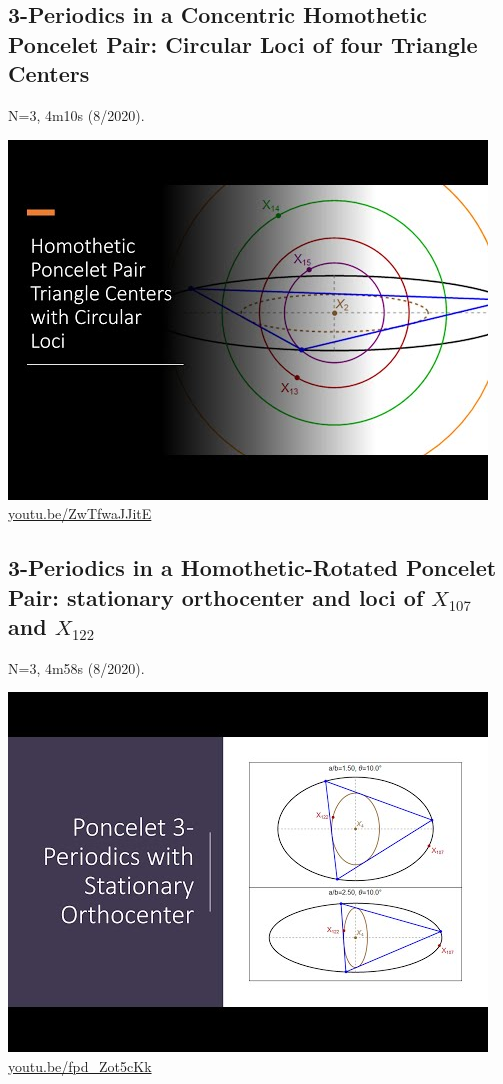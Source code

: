 \documentclass[12pt]{amsart}
\begin{document}
\subsection{3-Periodics in a Concentric Homothetic Poncelet Pair: Circular Loci of four Triangle Centers}
\label{vid:ZwTfwaJJitE}
\noindent N=3, 4m10s (8/2020). 
\begin{center}\includegraphics[width=.5\textwidth]{pics/ZwTfwaJJitE.jpg} \\ 
\href{https://youtu.be/ZwTfwaJJitE}{\url{youtu.be/ZwTfwaJJitE}}\end{center}
% 
\subsection{3-Periodics in a Homothetic-Rotated Poncelet Pair: stationary orthocenter and loci of $X_{107}$ and $X_{122}$}
\label{vid:fpd_Zot5cKk}
\noindent N=3, 4m58s (8/2020). 
\begin{center}\includegraphics[width=.5\textwidth]{pics/fpd_Zot5cKk.jpg} \\ 
\href{https://youtu.be/fpd_Zot5cKk}{\url{youtu.be/fpd\_Zot5cKk}}\end{center}
% 
\end{document}
